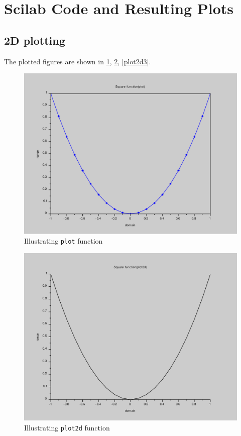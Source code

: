 \section*{Scilab Code and Resulting Plots}
\subsection*{2D plotting}




The plotted figures are shown in \ref{plot}, \ref{plot2d}, \ref{plot2d3}.

\begin{figure}
\includegraphics[scale=.5]{scilabCode/plotfunction.pdf}
\caption{Illustrating \texttt{plot} function}
\label{plot}
\end{figure}

\begin{figure}
\includegraphics[scale=.5]{scilabCode/plot2dfunction.pdf}
\caption{Illustrating \texttt{plot2d} function}
\label{plot2d}
\end{figure}


